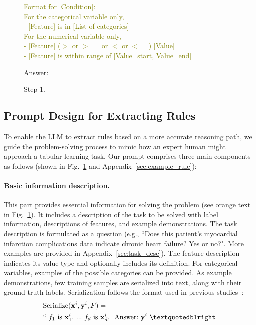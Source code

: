 \documentclass{article}
\theoremstyle{plain}
\theoremstyle{definition}
\theoremstyle{remark}
\newcommand{\cutparagraphup}{\vspace*{-0.12in}}
\begin{document}
\begin{figure}[ht]
\begin{tcolorbox}[enhanced,attach boxed title to top center={yshift=-3mm,yshifttext=-1mm},
  colback=black!0!white, colframe=black!20!white, colbacktitle=black!10!white, coltitle=blue!20!black ]
{\textcolor{olive}{Format for [Condition]: \\
For the categorical variable only, \\
- [Feature] is in [List of categories]\\
For the numerical variable only,\\
- [Feature] ($>$ or $>=$ or $<$ or $<=$) [Value]\\
- [Feature] is within range of [Value\_start, Value\_end]\\}

Answer:

Step 1. 
}
\end{tcolorbox}
\label{fig:prompt_for_rule}            
\end{figure}

\subsection{Prompt Design for Extracting Rules}
\label{Sec:prompt_design}
To enable the LLM to extract rules based on a more accurate reasoning path, we guide the problem-solving process to mimic how an expert human might approach a tabular learning task. 
Our prompt comprises three main components as follows (shown in  Fig.~\ref{fig:prompt_for_rule} and Appendix~\ref{sec:example_rule}):

\cutparagraphup
\paragraph{Basic information description.} This part provides essential information for solving the problem (see orange text in Fig.~\ref{fig:prompt_for_rule}). It includes a description of the task to be solved with label information, descriptions of features, and example demonstrations. The task description is formulated as a question (e.g., ``Does this patient's myocardial infarction complications data indicate chronic heart failure? Yes or no?". More examples are provided in Appendix~\ref{sec:task_desc}). The feature description indicates its value type and optionally includes its definition. For categorical variables, examples of the possible categories can be provided. As example demonstrations, few training samples are serialized into text, along with their ground-truth labels. Serialization follows the format used in previous studies~\cite{dinh2022lift,hegselmann2023tabllm}: 
\begin{align}
&\text{Serialize}(\mathbf{x}^i,\mathbf{y}^i, F) = \nonumber \\ 
&``\ f_1\ \text{is}\ \mathbf{x}^i_1.\ ... \ f_d\  \text{is}\  \mathbf{x}^i_d.\ \ \text{Answer:}\  \mathbf{y}^i\ ”
\end{align}
\end{document}
